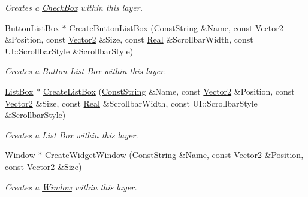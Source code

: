 \begin{DoxyCompactItemize}
\begin{DoxyCompactList}\small\item\em Creates a \hyperlink{classphys_1_1UI_1_1CheckBox}{CheckBox} within this layer. \item\end{DoxyCompactList}\item 
\hyperlink{classphys_1_1UI_1_1ButtonListBox}{ButtonListBox} $\ast$ \hyperlink{classphys_1_1UI_1_1Layer_a210f6094577ca79cbbf28d4fdd6cbd31}{CreateButtonListBox} (\hyperlink{namespacephys_a5ce5049f8b4bf88d6413c47b504ebb31}{ConstString} \&Name, const \hyperlink{classphys_1_1Vector2}{Vector2} \&Position, const \hyperlink{classphys_1_1Vector2}{Vector2} \&Size, const \hyperlink{namespacephys_af7eb897198d265b8e868f45240230d5f}{Real} \&ScrollbarWidth, const UI::ScrollbarStyle \&ScrollbarStyle)
\begin{DoxyCompactList}\small\item\em Creates a \hyperlink{classphys_1_1UI_1_1Button}{Button} List Box within this layer. \item\end{DoxyCompactList}\item 
\hyperlink{classphys_1_1UI_1_1ListBox}{ListBox} $\ast$ \hyperlink{classphys_1_1UI_1_1Layer_aef07620ee732d4e679bf6f7a4d704b5b}{CreateListBox} (\hyperlink{namespacephys_a5ce5049f8b4bf88d6413c47b504ebb31}{ConstString} \&Name, const \hyperlink{classphys_1_1Vector2}{Vector2} \&Position, const \hyperlink{classphys_1_1Vector2}{Vector2} \&Size, const \hyperlink{namespacephys_af7eb897198d265b8e868f45240230d5f}{Real} \&ScrollbarWidth, const UI::ScrollbarStyle \&ScrollbarStyle)
\begin{DoxyCompactList}\small\item\em Creates a List Box within this layer. \item\end{DoxyCompactList}\item 
\hyperlink{classphys_1_1UI_1_1Window}{Window} $\ast$ \hyperlink{classphys_1_1UI_1_1Layer_a383551d12e332d756260d87a54e4ef8e}{CreateWidgetWindow} (\hyperlink{namespacephys_a5ce5049f8b4bf88d6413c47b504ebb31}{ConstString} \&Name, const \hyperlink{classphys_1_1Vector2}{Vector2} \&Position, const \hyperlink{classphys_1_1Vector2}{Vector2} \&Size)
\begin{DoxyCompactList}\small\item\em Creates a \hyperlink{classphys_1_1UI_1_1Window}{Window} within this layer. \item\end{DoxyCompactList}\item 

\end{DoxyCompactItemize}
